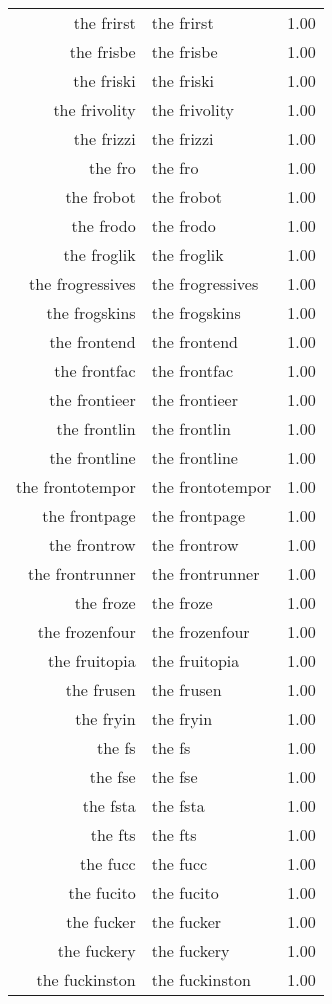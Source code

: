 \begin{table}[ht]
\begin{tabular}{rlr}
  the frirst & the frirst & 1.00 \\ 
  the frisbe & the frisbe & 1.00 \\ 
  the friski & the friski & 1.00 \\ 
  the frivolity & the frivolity & 1.00 \\ 
  the frizzi & the frizzi & 1.00 \\ 
  the fro & the fro & 1.00 \\ 
  the frobot & the frobot & 1.00 \\ 
  the frodo & the frodo & 1.00 \\ 
  the froglik & the froglik & 1.00 \\ 
  the frogressives & the frogressives & 1.00 \\ 
  the frogskins & the frogskins & 1.00 \\ 
  the frontend & the frontend & 1.00 \\ 
  the frontfac & the frontfac & 1.00 \\ 
  the frontieer & the frontieer & 1.00 \\ 
  the frontlin & the frontlin & 1.00 \\ 
  the frontline & the frontline & 1.00 \\ 
  the frontotempor & the frontotempor & 1.00 \\ 
  the frontpage & the frontpage & 1.00 \\ 
  the frontrow & the frontrow & 1.00 \\ 
  the frontrunner & the frontrunner & 1.00 \\ 
  the froze & the froze & 1.00 \\ 
  the frozenfour & the frozenfour & 1.00 \\ 
  the fruitopia & the fruitopia & 1.00 \\ 
  the frusen & the frusen & 1.00 \\ 
  the fryin & the fryin & 1.00 \\ 
  the fs & the fs & 1.00 \\ 
  the fse & the fse & 1.00 \\ 
  the fsta & the fsta & 1.00 \\ 
  the fts & the fts & 1.00 \\ 
  the fucc & the fucc & 1.00 \\ 
  the fucito & the fucito & 1.00 \\ 
  the fucker & the fucker & 1.00 \\ 
  the fuckery & the fuckery & 1.00 \\ 
  the fuckinston & the fuckinston & 1.00 \\ 

\end{tabular}
\end{table}
